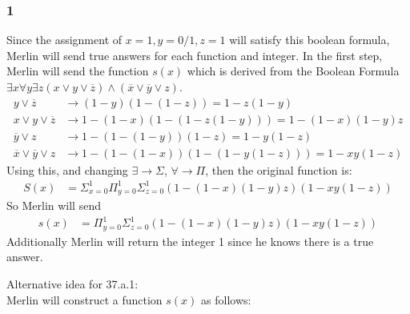 \documentclass[letterpaper,notitlepage,twoside]{article}
\begin{document}
\subsubsection*{1}
Since the assignment of $x=1,y=0/1,z=1$ will satisfy this boolean formula, Merlin will send true answers for each function and integer. In the first step, Merlin will send the function $s(x)$ which is derived from the Boolean Formula $\exists x \forall y \exists z ( x \lor y \lor \overline{z}) \land (\overline{x} \lor \overline{y} \lor z)$.
\begin{align*}
y \lor \overline{z} &\rightarrow (1 - y)(1 - (1 - z)) = 1 - z(1 - y)\\
x \lor y \lor \overline{z} &\rightarrow 1 - (1 - x)(1 - (1 - z(1 - y))) = 1 - (1 - x)(1 - y)z\\
\overline{y} \lor z &\rightarrow 1 - (1 - (1 - y))(1 - z) = 1 - y(1 - z)\\
\overline{x} \lor \overline{y} \lor z &\rightarrow 1 - (1 - (1 - x))(1 - (1 - y(1 - z))) = 1 - xy(1 - z)
\end{align*}
Using this, and changing $\exists \rightarrow \Sigma$, $\forall \rightarrow \Pi$, then the original function is:
\begin{align*}
S(x)&=\Sigma_{x = 0}^1\Pi_{y = 0}^1\Sigma_{z = 0}^1 (1 - (1 - x)(1 - y)z)(1 - xy(1 - z))
\end{align*}
So Merlin will send
\begin{align*}
s(x)&=\Pi_{y = 0}^1\Sigma_{z = 0}^1 (1 - (1 - x)(1 - y)z)(1 - xy(1 - z))
\end{align*}
Additionally Merlin will return the integer 1 since he knows there is a true answer.

Alternative idea for 37.a.1:\\
Merlin will construct a function $s(x)$ as follows:
\end{document}
